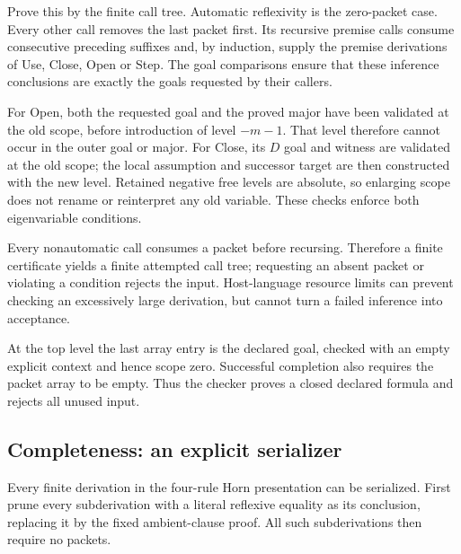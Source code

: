 Prove this by the finite call tree. Automatic reflexivity is the
zero-packet case. Every other call removes the last packet first.
Its recursive premise calls consume consecutive preceding suffixes
and, by induction, supply the premise derivations of Use, Close,
Open or Step. The goal comparisons ensure that these inference
conclusions are exactly the goals requested by their callers.

For Open, both the requested goal and the proved major have been
validated at the old scope, before introduction of level \(-m-1\).
That level therefore cannot occur in the outer goal or major.
For Close, its \(D\) goal and witness are validated at the old scope;
the local assumption and successor target are then constructed with
the new level. Retained negative free levels are absolute, so enlarging
scope does not rename or reinterpret any old variable.
These checks enforce both eigenvariable conditions.

Every nonautomatic call consumes a packet before recursing. Therefore
a finite certificate yields a finite attempted call tree; requesting
an absent packet or violating a condition rejects the input.
Host-language resource limits can prevent checking an excessively
large derivation, but cannot turn a failed inference into acceptance.

At the top level the last array entry is the declared goal, checked
with an empty explicit context and hence scope zero. Successful
completion also requires the packet array to be empty. Thus the
checker proves a closed declared formula and rejects all unused input.

\subsection{Completeness: an explicit serializer}
Every finite derivation in the four-rule Horn presentation can be
serialized. First prune every subderivation with a literal reflexive
equality as its conclusion, replacing it by the fixed ambient-clause
proof. All such subderivations then require no packets.

